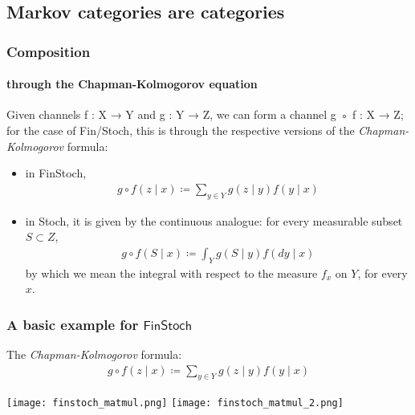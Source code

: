 \subsection{Markov categories are categories}


\begin{frame}
    \frametitle{Composition}
    \framesubtitle{through the Chapman-Kolmogorov equation}
    Given channels f : X → Y and g : Y → Z, we can form a channel g ◦ f : X → Z; for the case of Fin/Stoch, this is through the respective versions of the \emph{Chapman-Kolmogorov} formula:\pause
    \begin{itemize}
        \item in FinStoch,
        \begin{align}
            g\circ f (z\mid x) \coloneqq \sum_{y\in Y} g(z\mid y) f(y\mid x)
        \end{align}\pause
        \item in Stoch, it is given by the continuous analogue: for every measurable subset $S\subset Z$,
        \begin{align}
            g\circ f (S\mid x) \coloneqq \int_Y g(S\mid y) f(dy\mid x)
        \end{align}
        by which we mean the integral with respect to the measure $f_x$ on $Y$, for every $x$.
\end{itemize}
\end{frame}

\begin{frame}
    \frametitle{A basic example for $\mathsf{FinStoch}$}
    \begin{minipage}{.48\textwidth}
    The \emph{Chapman-Kolmogorov} formula:
    \begin{align*}
        g\circ f (z\mid x) \coloneqq \sum_{y\in Y} g(z\mid y) f(y\mid x)
    \end{align*}
    \end{minipage}
    \hfill
    \begin{minipage}{.45\textwidth}
        \texttt{[image: finstoch\_matmul.png]}
        \texttt{[image: finstoch\_matmul\_2.png]}
    \end{minipage}
    
\end{frame}


